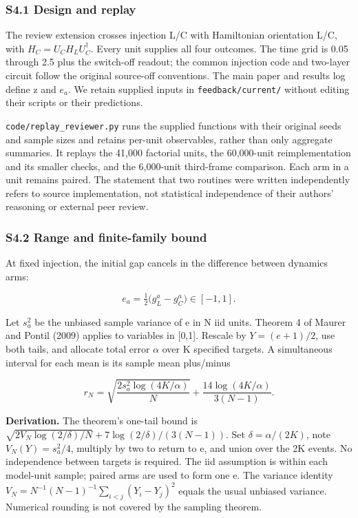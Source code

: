 \documentclass[
  10pt,
  a4paper,
]{article}
\begin{document}
\subsubsection{S4.1 Design and replay}\label{s4.1-design-and-replay}

The review extension crosses injection L/C with Hamiltonian orientation
L/C, with \(H_C=U_C H_L U_C^\dagger\). Every unit supplies all four
outcomes. The time grid is 0.05 through 2.5 plus the switch-off readout;
the common injection code and two-layer circuit follow the original
source-off conventions. The main paper and results log define z and
\(e_a\). We retain supplied inputs in \nolinkurl{feedback/current/}
without editing their scripts or their predictions.

\nolinkurl{code/replay_reviewer.py} runs the supplied functions with
their original seeds and sample sizes and retains per-unit observables,
rather than only aggregate summaries. It replays the 41,000 factorial
units, the 60,000-unit reimplementation and its smaller checks, and the
6,000-unit third-frame comparison. Each arm in a unit remains paired.
The statement that two routines were written independently refers to
source implementation, not statistical independence of their authors'
reasoning or external peer review.

\subsubsection{S4.2 Range and finite-family
bound}\label{s4.2-range-and-finite-family-bound}

At fixed injection, the initial gap cancels in the difference between
dynamics arms:

\[e_a=\tfrac12\bigl(g_L^a-g_C^a\bigr)\in[-1,1].\]

Let \(s_a^2\) be the unbiased sample variance of e in N iid units.
Theorem 4 of Maurer and Pontil (2009) applies to variables in {[}0,1{]}.
Rescale by \(Y=(e+1)/2\), use both tails, and allocate total error
\(\alpha\) over K specified targets. A simultaneous interval for each
mean is its sample mean plus/minus

\[r_N=\sqrt{\frac{2s_a^2\log(4K/\alpha)}N}+\frac{14\log(4K/\alpha)}{3(N-1)}.\]

\textbf{Derivation.} The theorem's one-tail bound is
\(\sqrt{2V_N\log(2/\delta)/N}+7\log(2/\delta)/(3(N-1))\). Set
\(\delta=\alpha/(2K)\), note \(V_N(Y)=s_a^2/4\), multiply by two to
return to e, and union over the 2K events. No independence between
targets is required. The iid assumption is within each model-unit
sample; paired arms are used to form one e. The variance identity
\(V_N=N^{-1}(N-1)^{-1}\sum_{i<j}(Y_i-Y_j)^2\) equals the usual unbiased
variance. Numerical rounding is not covered by the sampling theorem.
\end{document}
